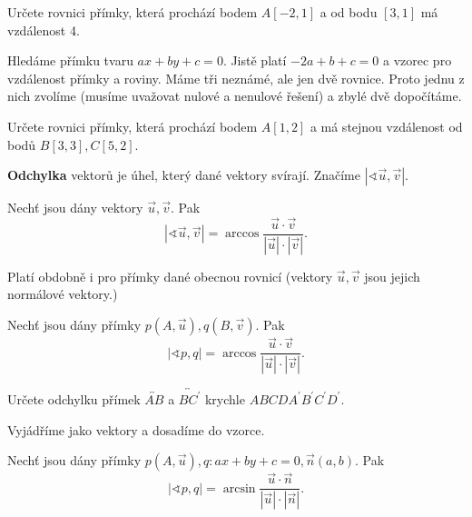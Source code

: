 \begin{priklad}
Určete rovnici přímky, která prochází bodem $A[-2,1]$ a od bodu $[3,1]$ má vzdálenost 4.
\end{priklad}

\begin{reseni}
Hledáme přímku tvaru $ax+by+c=0$. Jistě platí $-2a+b+c=0$ a vzorec pro vzdálenost přímky a roviny.
Máme tři neznámé, ale jen dvě rovnice. Proto jednu z nich zvolíme (musíme uvažovat
nulové a nenulové řešení) a zbylé dvě dopočítáme.
\end{reseni}

\begin{priklad}
Určete rovnici přímky, která prochází bodem $A[1,2]$ a má stejnou vzdálenost od bodů
$B[3,3], C[5,2].$
\end{priklad}


\begin{definition}
    \textbf{Odchylka} vektorů je úhel, který dané vektory svírají. Značíme $|\sphericalangle \vec u, \vec v|.$
\end{definition}

\begin{veta}
    Nechť jsou dány vektory $\vec u, \vec v.$ Pak
    $$|\sphericalangle \vec u, \vec v|=\arccos \frac{\vec u \cdot \vec v}{|\vec u|\cdot |\vec v|}.$$
\end{veta}

\begin{pozn}
    Platí obdobně i pro přímky dané obecnou rovnicí (vektory $\vec u, \vec v$ jsou
    jejich normálové vektory.)
\end{pozn}

\begin{veta}
    Nechť jsou dány přímky $p(A,\vec u), q(B, \vec v).$ Pak
    $$|\sphericalangle p, q|=\arccos \frac{\vec u \cdot \vec v}{|\vec u|\cdot |\vec v|}.$$
\end{veta}

\begin{priklad}
Určete odchylku přímek $\overleftrightarrow{AB}$ a $\overleftrightarrow{BC^\prime}$
krychle $ABCDA^\prime B^\prime C^\prime D^\prime$.
\end{priklad}

\begin{reseni}
Vyjádříme jako vektory a dosadíme do vzorce.
\end{reseni}

\begin{veta}
Nechť jsou dány přímky $p(A,\vec u), q:ax+by+c=0, \vec n(a,b).$ Pak
$$|\sphericalangle p, q|=\arcsin \frac{\vec u \cdot \vec n}{|\vec u|\cdot |\vec n|}.$$
\end{veta}


